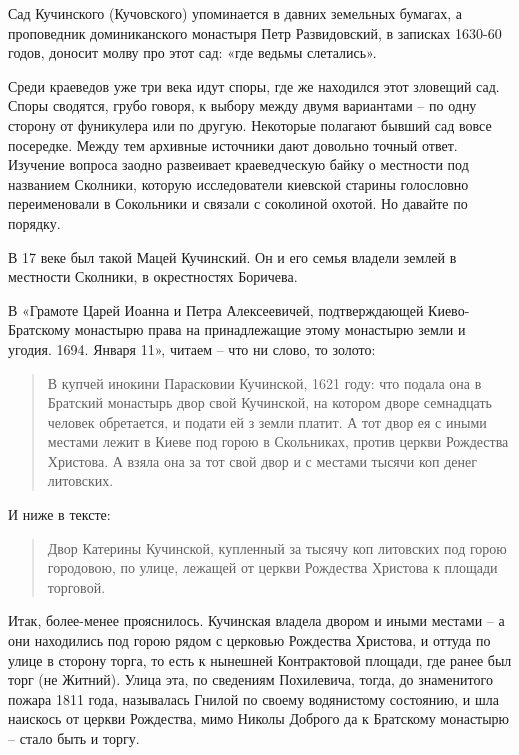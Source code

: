
Сад Кучинского (Кучовского) упоминается в давних земельных бумагах, а проповедник доминиканского монастыря Петр Развидовский, в записках 1630-60 годов, доносит молву про этот сад: «где ведьмы слетались».

Среди краеведов уже три века идут споры, где же находился этот зловещий сад. Споры сводятся, грубо говоря, к выбору между двумя вариантами – по одну сторону от фуникулера или по другую. Некоторые полагают бывший сад вовсе посередке. Между тем архивные источники дают довольно точный ответ. Изучение вопроса заодно развеивает краеведческую байку о местности под названием Сколники, которую исследователи киевской старины голословно переименовали в Сокольники и связали с соколиной охотой. Но давайте по порядку.

В 17 веке был такой Мацей Кучинский. Он и его семья владели землей в местности Сколники, в окрестностях Боричева.

В «Грамоте Царей Иоанна и Петра Алексеевичей, подтверждающей Киево-Братскому монастырю права на принадлежащие этому монастырю земли и угодия. 1694. Января 11»\cite{sbornikmat}, читаем – что ни слово, то золото:

\begin{quotation}
В купчей инокини Парасковии Кучинской, 1621 году: что подала она в Братский монастырь двор свой Кучинской, на котором дворе семнадцать человек обретается, и подати ей з земли платит. А тот двор ея с иными местами лежит в Киеве под горою в Скольниках, против церкви Рождества Христова. А взяла она за тот свой двор и с местами тысячи коп денег литовских.
\end{quotation}

И ниже в тексте:

\begin{quotation}
Двор Катерины Кучинской, купленный за тысячу коп литовских под горою городовою, по улице, лежащей от церкви Рождества Христова к площади торговой.
\end{quotation}

Итак, более-менее прояснилось. Кучинская владела двором и иными местами – а они находились под горою рядом с церковью Рождества Христова, и оттуда по улице в сторону торга, то есть к нынешней Контрактовой площади, где ранее был торг (не Житний). Улица эта, по сведениям Похилевича\cite{pohilmon}, тогда, до знаменитого пожара 1811 года, называлась Гнилой по своему водянистому состоянию, и шла наискось от церкви Рождества, мимо Николы Доброго да к Братскому монастырю – стало быть и торгу.

